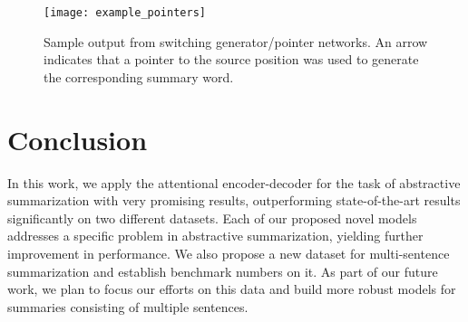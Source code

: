 \documentclass[11pt]{article}
\begin{document}
\begin{figure} 
	\centering
  \texttt{[image: example\_pointers]}
 \vspace{-0.4in}
\caption{{\small Sample output from switching generator/pointer networks. An arrow indicates that a pointer to the source position was used to generate the corresponding summary word.}}
\label{fig:example_pointers}	
\end{figure}

 
\section{Conclusion}\label{sec:conclusion}
In this work, we apply the attentional encoder-decoder for the task of abstractive summarization with very promising results, outperforming state-of-the-art results significantly on two different datasets. Each of our proposed novel models addresses a specific problem in abstractive summarization, yielding further improvement in performance. We also propose a new dataset for multi-sentence summarization and establish benchmark numbers on it. As part of our future work, we plan to focus our efforts on this data and build more robust models for summaries consisting of multiple sentences.


 


\end{document}
